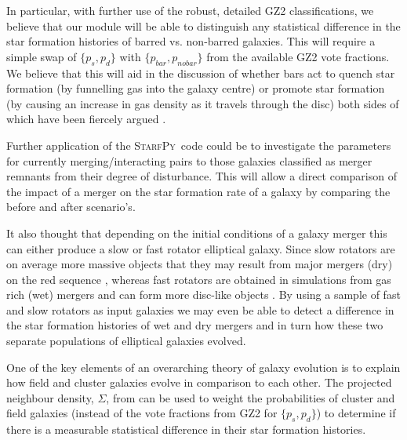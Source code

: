 \documentclass[useAMS,usenatbib]{mn2e}
\def\starfpy {\textsc{StarfPy}}
\begin{document}
In particular, with further use of the robust, detailed GZ2 classifications, we believe that our module will be able to distinguish any statistical difference in the star formation histories of barred vs. non-barred galaxies. This will require a simple swap of $\{p_s, p_d\}$ with $\{p_{bar}, p_{no bar}\}$ from the available GZ2 vote fractions. We believe that this will aid in the discussion of whether bars act to quench star formation (by funnelling gas into the galaxy centre) or promote star formation (by causing an increase in gas density as it travels through the disc) both sides of which have been fiercely argued \citep{Masters11, Masters12, Sheth05, Ellison11}. 

Further application of the \starfpy ~code could be to investigate the parameters for currently merging/interacting pairs to those galaxies classified as merger remnants from their degree of disturbance. This will allow a direct comparison of the impact of a merger on the star formation rate of a galaxy by comparing the before and after scenario's. 

It also thought that depending on the initial conditions of a galaxy merger this can either produce a slow or fast rotator elliptical galaxy. Since slow rotators are on average more massive objects that they may result from major mergers (dry) on the red sequence \citep{Em11} , whereas fast rotators are obtained in simulations from gas rich (wet) mergers and can form more disc-like objects \citep{Em07}. By using a sample of fast and slow rotators as input galaxies we may even be able to detect a difference in the star formation histories of wet and dry mergers and in turn how these two separate populations of elliptical galaxies evolved. 

One of the key elements of an overarching theory of galaxy evolution is to explain how field and cluster galaxies evolve in comparison to each other. The projected neighbour density, $\Sigma$, from \citet{Baldry06} can be used to weight the probabilities of cluster and field galaxies (instead of the vote fractions from GZ2 for $\{p_s, p_d\}$) to determine if there is a measurable statistical difference in their star formation histories. 
\end{document}

